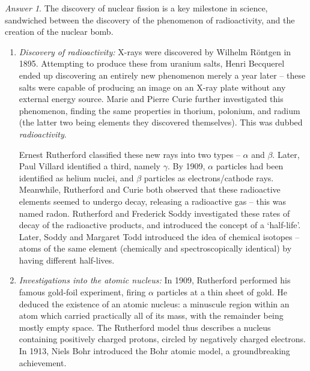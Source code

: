 \documentclass[11pt]{article}
\theoremstyle{remark}
\newtheorem*{answer}{Answer}
\begin{document}
    \begin{answer} The discovery of nuclear fission is a key milestone in science,
    sandwiched between the discovery of the phenomenon of radioactivity, and the
    creation of the nuclear bomb.

        \begin{enumerate}
            \item \textit{Discovery of radioactivity:} X-rays were discovered by
            Wilhelm R\"ontgen in 1895. Attempting to produce these from uranium
            salts, Henri Becquerel ended up discovering an entirely new phenomenon
            merely a year later -- these salts were capable of producing an image on
            an X-ray plate without any external energy source. Marie and Pierre Curie
            further investigated this phenomenon, finding the same properties in
            thorium, polonium, and radium (the latter two being elements they
            discovered themselves). This was dubbed \emph{radioactivity}. 

            Ernest Rutherford classified these new rays into two types -- $\alpha$
            and $\beta$. Later, Paul Villard identified a third, namely $\gamma$. By
            1909, $\alpha$ particles had been identified as helium nuclei, and
            $\beta$ particles as electrons/cathode rays. Meanwhile, Rutherford and
            Curie both observed that these radioactive elements seemed to undergo
            decay, releasing a radioactive gas -- this was named radon. Rutherford
            and Frederick Soddy investigated these rates of decay of the radioactive
            products, and introduced the concept of a `half-life'. Later, Soddy and
            Margaret Todd introduced the idea of chemical isotopes -- atoms of the
            same element (chemically and spectroscopically identical) by having
            different half-lives.


            \item \textit{Investigations into the atomic nucleus:} In 1909,
            Rutherford performed his famous gold-foil experiment, firing $\alpha$
            particles at a thin sheet of gold. He deduced the existence of an atomic
            nucleus: a minuscule region within an atom which carried practically all
            of its mass, with the remainder being mostly empty space. The Rutherford
            model thus describes a nucleus containing positively charged protons,
            circled by negatively charged electrons. In 1913, Niels Bohr introduced
            the Bohr atomic model, a groundbreaking achievement.


\end{enumerate}
\end{answer}
\end{document}
